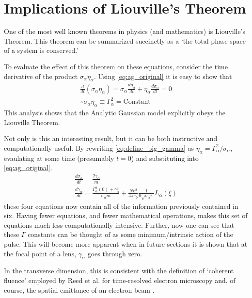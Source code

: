 
\section{Implications of Liouville's Theorem}

One of the most well known theorems in physics (and mathematics) is Liouville's Theorem.
This theorem can be summarized succinctly as a `the total phase space of a system is conserved.'

To evaluate the effect of this theorem on these equations, consider the time derivative of the product $\sigma_{\alpha} \eta_{\alpha}$.
Using \ref{eq:ag_original} it is easy to show that
\begin{gather}
  \frac{d}{dt} (\sigma_{\alpha} \eta_{\alpha}) = \sigma_{\alpha} \frac{d \eta_{\alpha}}{dt} + \eta_{\alpha} \frac{d \sigma_{\alpha}}{dt} = 0\\
  \label{eq:define_big_gamma}
  \therefore \sigma_{\alpha} \eta_{\alpha} \equiv \Gamma_{\alpha}^2 = \text{Constant}
\end{gather}
This analysis shows that the Analytic Gaussian model explicitly obeys the Liouville Theorem.

Not only is this an interesting result, but it can be both instructive and computationally useful.
By rewriting \ref{eq:define_big_gamma} as $\eta_{\alpha} = \Gamma_{\alpha}^2 / \sigma_{\alpha}$, evaulating at some time (presumably $t=0$) and substituting into \ref{eq:ag_original}.
\begin{subequations} \label{eq:ag_big_gamma}
\begin{gather}
  \frac{d\sigma_{\alpha}}{dt} = \frac{2\gamma_{\alpha}}{m} \\
  \frac{d\gamma_{\alpha}}{dt} = \frac{ \Gamma_{\alpha}^2(0) + \gamma_{\alpha}^2 }{\sigma_{\alpha} m}
    + \frac{N e^2}{4\pi\varepsilon_0} \frac{1}{6 \sqrt{\sigma_{\alpha}\pi}} L_{\alpha}(\xi)
\end{gather}
\end{subequations}
these four equations now contain all of the information previously contained in six.
Having fewer equations, and fewer mathematical operations, makes this set of equations much less computationally intensive.
Further, now one can see that these $\Gamma$ constants can be thought of as some minimum/intrinsic action of the pulse. 
This will become more apparent when in future sections
it is shown that at the focal point of a lens, $\gamma_{\alpha}$ goes through zero.

In the transverse dimension, this is consistent with the definition of `coherent fluence' employed by Reed et al.\cite{reed_evolution_2009} for time-resolved electron microscopy and, of course, the spatial emittance of an electron beam \cite{jensen_theoretical_2006,siwick_ultrafast_2002}.
